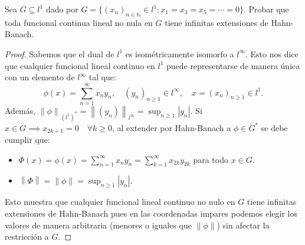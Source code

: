 \documentclass{article}
\theoremstyle{definition}
\newcommand{\N}{\mathbb{N}}
\newcommand{\norm}[1]{\left\lVert #1 \right\rVert}       %
\newenvironment{ejercicio}[1]{\begin{trivlist}
\item[\hskip \labelsep {\bfseries Ejercicio}\hskip \labelsep {\bfseries #1.}]}{\end{trivlist}}
\begin{document}
\vspace{0.5cm}

\begin{ejercicio}{4}
    Sea \(G\subseteq l^{1}\) dado por \( G={\{(x_{n})}_{n\in\N}\in l^{1}:x_{1}=x_{3}=x_{5}= \cdots =0 \} \). Probar que toda funcional continua lineal no nula en \(G\) tiene infinitas extensiones de Hahn-Banach.
\end{ejercicio}
\begin{proof}
    Sabemos que el dual de \( l^1 \) es isométricamente isomorfo a \( l^{\infty} \). Esto nos dice que cualquier funcional lineal continuo en \( l^1 \) puede representarse de manera única con un elemento de \( l^{\infty} \) tal que: \[
        \phi(x) = \sum_{n=1}^{\infty} x_n y_n, \quad {(y_n)}_{n\ge1} \in l^{\infty}, \quad x = {(x_n)}_{n\ge1} \in l^1.
    \]
    Además, \( \norm{\phi}_{{(l^1)}^*} = \norm{(y_n)}_{l^{\infty}} = \sup_{n \ge 1} |y_n|\). Si \( x \in G \implies x_{2k+1} = 0 \quad \forall k \ge 0 \), al extender por Hahn-Banach a \( \phi \in G^* \) se debe cumplir que:\begin{itemize}
        \item \( \Phi(x) = \phi(x) = \sum_{n=1}^{\infty} x_n y_n =  \sum_{k=1}^{\infty} x_{2k} y_{2k} \) para todo \( x \in G \).
        \item \( \norm{\Phi} = \norm{\phi} = \sup_{n \ge 1} |y_n| \).
    \end{itemize}

    Esto muestra que cualquier funcional lineal continuo no nulo en \( G \) tiene infinitas extensiones de Hahn-Banach pues en las coordenadas impares podemos elegir los valores de manera arbitraria (menores o iguales que \( \norm{\phi} \)) sin afectar la restricción a \( G \).
\end{proof}

\vspace{0.5cm}
\end{document}
